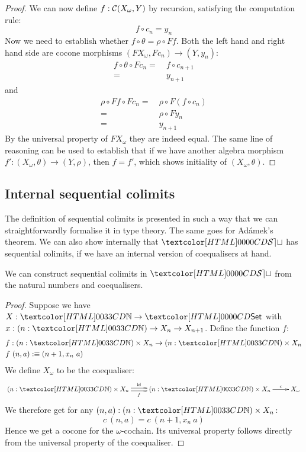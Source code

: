 \begin{proof}
  We can now define $f : \mathcal{C}(X_\omega, Y)$ by recursion, satisfying
  the computation rule:
  $$
  f \circ c_n = y_n
  $$
  Now we need to establish whether $f \circ \theta = \rho \circ F
  f$.
  Both the left hand and right hand side are cocone morphisms
  $(F X_\omega , F c_n) \to (Y , y_n)$:
  \begin{align*}
    f \circ \theta \circ F c_n =&\ f \circ c_{n+1} \\
    =&\ y_{n+1}
  \end{align*}
  and
  \begin{align*}
    \rho \circ F f \circ F c_n =&\ \rho \circ F (f \circ c_n) \\
    =&\ \rho \circ F y_n \\
    =&\ y_{n+1}
  \end{align*}
  By the universal property of $F X_\omega$ they are indeed equal. The
  same line of reasoning can be used to establish that if we have
  another algebra morphism $f' : (X_\omega,\theta) \to (Y,\rho)$, then
  $f = f'$, which shows initiality of $(X_\omega,\theta)$.
\end{proof}

\subsection{Internal sequential colimits}

The definition of sequential colimits is presented in such a way that
we can straightforwardly formalise it in type theory. The same goes
for Ad\'amek's theorem. We can also show internally that $\SET$ has
sequential colimits, if we have an internal version of coequalisers at
hand.

\begin{proposition}
  We can construct sequential colimits in $\SET$ from the natural
  numbers and coequalisers.
\end{proposition}

\begin{proof}
  Suppose we have $X : \natty \to \Set$ with
  $x : (n : \natty) \to X_n \to X_{n+1}$. Define the function $f$:
  \begin{align*}
    &f : (n : \natty) \times X_n \to (n : \natty) \times X_n \\
    &f\ (n , a) \ddefeq (n + 1 , x_n\ a)
  \end{align*}
  We define $X_\omega$ to be the coequaliser:
  $$
  \xymatrix{
    (n : \natty) \times X_n
    \ar@<.5ex>[r]^{\id}
    \ar@<-.5ex>[r]_{f}
    &(n : \natty) \times X_n
    \ar[r]^-{c}
    &X_\omega
  }
  $$
  We therefore get for any $(n , a) : (n : \natty) \times X_n$:
  $$
  c\ (n , a) = c\ (n + 1 , x_n\ a)
  $$
  Hence we get a cocone for the $\omega$-cochain. Its universal
  property follows directly from the universal property of the
  coequaliser.
\end{proof}


